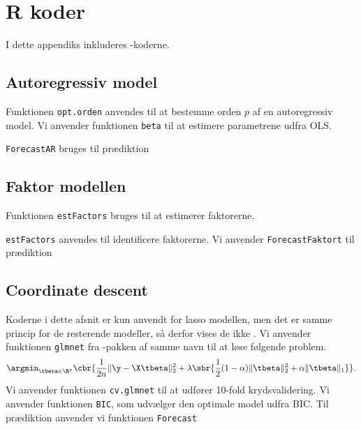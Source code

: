 \chapter{R koder} \label{app:r_koder}
I dette appendiks inkluderes \Rlang-koderne. 

\section{Autoregressiv model} \label{sec:auto}
Funktionen \texttt{opt.orden} anvendes til at bestemme orden $p$ af en autoregressiv model.  
%
Vi anvender funktionen \texttt{beta} til at estimere parametrene udfra OLS. 

\texttt{ForecastAR} bruges til prædiktion

\section{Faktor modellen} \label{sec:faktor}
Funktionen \texttt{estFactors} bruges til at estimerer faktorerne.

\texttt{estFactors} anvendes til identificere faktorerne. 
%
%
Vi anvender \texttt{ForecastFaktort} til prædiktion

\section{Coordinate descent} \label{sec:lasso}
Koderne i dette afsnit er kun anvendt for lasso modellen, men det er samme princip for de resterende modeller, så derfor vises de ikke . 
Vi anvender funktionen \texttt{glmnet} fra \Rlang-pakken  af samme navn til at løse følgende problem. 
\begin{align}
\argmin_{\tbeta \in \R^p} \cbr{ \frac{1}{2n} \Vert \y - \X \tbeta \Vert_2^2 + \lambda \sbr{\frac{1}{2}(1- \alpha) \Vert \tbeta \Vert_2^2 + \alpha \Vert \tbeta \Vert_1}}. \label{eq:4.2}
\end{align}
%
Vi anvender  funktionen  \texttt{cv.glmnet} til at udfører 10-fold krydsvalidering. 
%
Vi anvender funktionen \texttt{BIC}, som udvælger den optimale model udfra BIC. 
%
Til prædiktion anvender vi funktionen \texttt{Forecast} 



